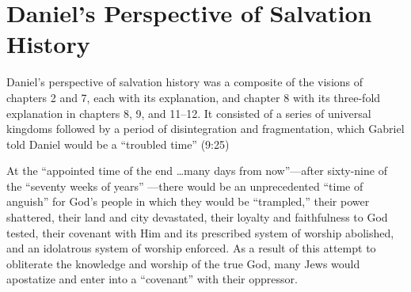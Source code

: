 \section{Daniel's Perspective of Salvation History}

Daniel's perspective of salvation history was a composite of the visions of
chapters 2 and 7, each with its explanation, and chapter 8 with
its three-fold explanation in chapters 8, 9, and 11--12. It consisted of a 
series of universal kingdoms followed by a period of disintegration and
fragmentation, which Gabriel told Daniel would be a ``troubled time''
(9:25)

At the ``appointed time of the end \ldots many days from now''---after sixty-nine
of the ``seventy weeks of years''
---there would be an unprecedented ``time of
anguish'' for God's people in which they would be ``trampled,'' their power
shattered, their land and city 
devastated, their loyalty and
faithfulness to God tested, 
their covenant with Him and its prescribed
system of worship abolished,
and an idolatrous system of worship
enforced. As a result of this attempt to obliterate the knowledge and
worship of the true God, many Jews would apostatize and enter into a
``covenant'' with their oppressor.

